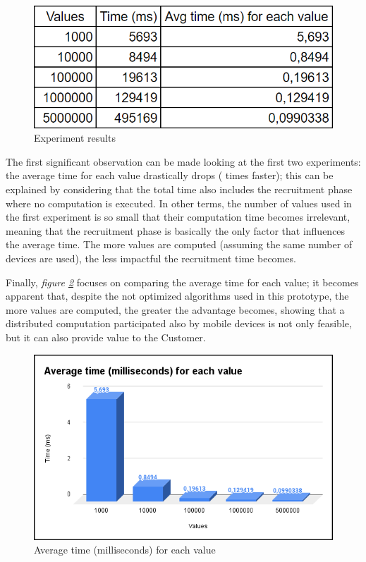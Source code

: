 \begin{figure}[!ht]
    \centering
    \includegraphics[scale=0.55]{document/chapters/chapter_7/images/experiment_results.png}
    \caption{Experiment results}
    \label{fig:experiment_results}
\end{figure}

The first significant observation can be made looking at the first two experiments: the average time for each value drastically drops ( times faster); this can be explained by considering that the total time also includes the recruitment phase where no computation is executed. In other terms, the number of values used in the first experiment is so small that their computation time becomes irrelevant, meaning that the recruitment phase is basically the only factor that influences the average time. The more values are computed (assuming the same number of devices are used), the less impactful the recruitment time becomes.

Finally, \textit{figure \ref{fig:experiment_results_avg_ms_per_value}} focuses on comparing the average time for each value; it becomes apparent that, despite the not optimized algorithms used in this prototype, the more values are computed, the greater the advantage becomes, showing that a distributed computation participated also by mobile devices is not only feasible, but it can also provide value to the Customer.

\begin{figure}[!ht]
    \centering
    \includegraphics[scale=0.55]{document/chapters/chapter_7/images/experiment_results_avg_ms_per_value.png}
    \caption{Average time (milliseconds) for each value}
    \label{fig:experiment_results_avg_ms_per_value}
\end{figure}